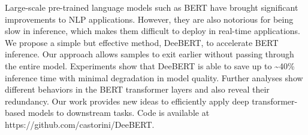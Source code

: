 Large-scale pre-trained language models such as BERT have brought significant improvements to NLP applications. However, they are also notorious for being slow in inference, which makes them difficult to deploy in real-time applications. We propose a simple but effective method, DeeBERT, to accelerate BERT inference. Our approach allows samples to exit earlier without passing through the entire model. Experiments show that DeeBERT is able to save up to {\textasciitilde}40\% inference time with minimal degradation in model quality. Further analyses show different behaviors in the BERT transformer layers and also reveal their redundancy. Our work provides new ideas to efficiently apply deep transformer-based models to downstream tasks. Code is available at https://github.com/castorini/DeeBERT.
